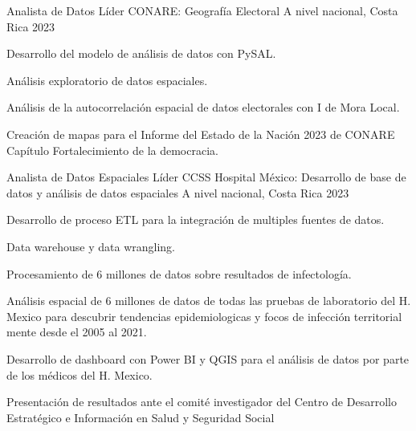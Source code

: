 

\begin{cventries}
\cventry
{Analista de Datos Líder} %
{CONARE: Geografía Electoral} %
{A nivel nacional, Costa Rica} %
{2023} %
{
  \begin{cvitems} %
    \item Desarrollo del modelo de análisis de datos con PySAL.
    \item Análisis exploratorio de datos espaciales.
    \item Análisis de la autocorrelación espacial de datos electorales
    con I de Mora Local.
    \item Creación de mapas para el Informe del Estado de la Nación 2023 de CONARE
    Capítulo Fortalecimiento de la democracia.
  \end{cvitems}
}
\cventry
{Analista de Datos Espaciales Líder} %
{CCSS Hospital México: Desarrollo de base de datos y análisis de datos espaciales} %
{A nivel nacional, Costa Rica} %
{2023} %
{
  \begin{cvitems} %
    \item Desarrollo de proceso ETL para la integración de multiples fuentes de datos.
    \item Data warehouse y data wrangling.
    \item Procesamiento de 6 millones de datos sobre resultados de infectología.
    \item Análisis espacial de 6 millones de datos de todas las pruebas de laboratorio
    del H. Mexico para descubrir tendencias epidemiologicas y focos de infección
    territorial mente desde el 2005 al 2021.
    \item Desarrollo de dashboard con Power BI y QGIS para el análisis de datos por
    parte de los médicos del H. Mexico.
    \item Presentación de resultados ante el comité investigador del Centro de
    Desarrollo Estratégico e Información en Salud y Seguridad Social

\end{cvitems}}
\end{cventries}
